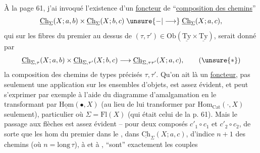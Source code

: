 À la page 61, j'ai invoqué l'existence d'un \uline{foncteur} de ``\uline{composition des chemins}''
\[
\underline{\mathrm{Ch}}_{\Sigma}(X;a,b)\times\underline{\mathrm{Ch}}_{\Sigma}(X;b,c)\mathrel{\unsure{-|\longrightarrow}}\underline{\mathrm{Ch}}_{\Sigma}(X;a,c),
\]
qui sur les fibres du premier  au dessus de $(\tau,\tau')\in\mathrm{Ob}(\underline{\mathrm{Ty}}\times\underline{\mathrm{Ty}})$, serait donné par
\[
\underline{\mathrm{Ch}}_{\Sigma,\tau}(X;a,b)\times\underline{\mathrm{Ch}}_{\Sigma,\tau'}(X;b,c)\longrightarrow\underline{\mathrm{Ch}}_{\Sigma,\tau\tau'}(X;a,c),\tag*{$(\unsure{*})$}
\]
la composition des chemins de types précisés $\tau,\tau'$. Qu'on ait là un \uline{foncteur}, pas seulement une application sur les ensembles d'objets, est assez évident, et peut s'exprimer par exemple à l'aide du diagramme d'amalgamation
en le transformant par $\underline{\mathrm{Hom}}(\bullet,X)$ (au lieu de lui  transformer par $\mathrm{Hom}_{\mathrm{Cat}}(\cdot,X)$ seulement),   particulier où $\Sigma=\mathrm{Fl}(X)$ (qui était celui de la p. 61). Mais le passage aux flèches est assez évident -- pour deux composés
$c'_1\circ c_1$ et $c'_2\circ c_2$, de sorte que les hom  du premier dans le , dans $\underline{\mathrm{Ch}}_{\Sigma}(X;a,c)$,   d'indice $n+1$ des  chemins (où $n=\mathrm{long}\,\tau$),  à   et à , ``sont'' exactement les couples

